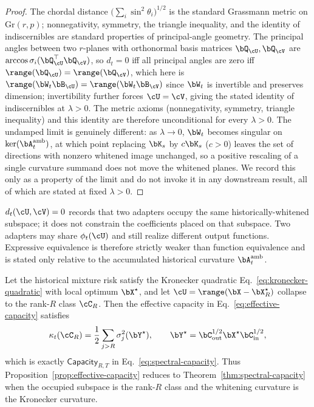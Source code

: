 \begin{proof}
The chordal distance $\big(\sum_i\sin^2\theta_i\big)^{1/2}$ is the standard
Grassmann metric on $\mathrm{Gr}(r,p)$; nonnegativity, symmetry, the triangle
inequality, and the identity of indiscernibles are standard properties of
principal-angle geometry. The principal angles between two $r$-planes with
orthonormal basis matrices $\bQ_{\cU},\bQ_{\cV}$ are
$\arccos\sigma_i(\bQ_{\cU}^\top\bQ_{\cV})$, so $d_t=0$ iff all principal angles are
zero iff $\range(\bQ_{\cU})=\range(\bQ_{\cV})$, which here is
$\range(\bW_t\bB_{\cU})=\range(\bW_t\bB_{\cV})$ since $\bW_t$ is invertible and
preserves dimension; invertibility further forces $\cU=\cV$, giving the stated
identity of indiscernibles at $\lambda>0$. The metric axioms
(nonnegativity, symmetry, triangle inequality) and this identity are therefore
unconditional for every $\lambda>0$. The undamped limit is genuinely different:
as $\lambda\to0$, $\bW_t$ becomes singular on $\ker(\bA_t^{\mathrm{amb}})$, at
which point replacing $\bK_s$ by $c\bK_s$ ($c>0$) leaves the set of directions
with nonzero whitened image unchanged, so a positive rescaling of a single
curvature summand does not move the whitened planes. We record this only as a
property of the limit and do not invoke it in any downstream result, all of
which are stated at fixed $\lambda>0$.
\end{proof}

\begin{remark}
\label{rem:expressivity-not-function}
$d_t(\cU,\cV)=0$ records that two adapters occupy the same
historically-whitened subspace; it does not constrain the coefficients placed
on that subspace. Two adapters may share $\phi_t(\cU)$ and still realize
different output functions. Expressive equivalence is therefore strictly
weaker than function equivalence and is stated only relative to the
accumulated historical curvature $\bA_t^{\mathrm{amb}}$.
\end{remark}

\begin{proposition}
\label{prop:effective-capacity}
Let the historical mixture risk satisfy the Kronecker quadratic
Eq.~\eqref{eq:kronecker-quadratic} with local optimum $\bX^\star$, and let
$\cU=\range(\bX-\bX_R^\star)$ collapse to the rank-$R$ class $\cC_R$. Then the
effective capacity in Eq.~\eqref{eq:effective-capacity} satisfies
\begin{equation}
  \kappa_t(\cC_R)
  =\frac12\sum_{j>R}\sigma_j^2(\bY^\star),
  \qquad
  \bY^\star=\bC_{\mathrm{out}}^{1/2}\bX^\star\bC_{\mathrm{in}}^{1/2},
  \label{eq:effective-capacity-reduces}
\end{equation}
which is exactly $\mathsf{Capacity}_{R,T}$ in
Eq.~\eqref{eq:spectral-capacity}. Thus
Proposition~\ref{prop:effective-capacity} reduces to
Theorem~\ref{thm:spectral-capacity} when the occupied subspace is the
rank-$R$ class and the whitening curvature is the Kronecker curvature.
\end{proposition}

